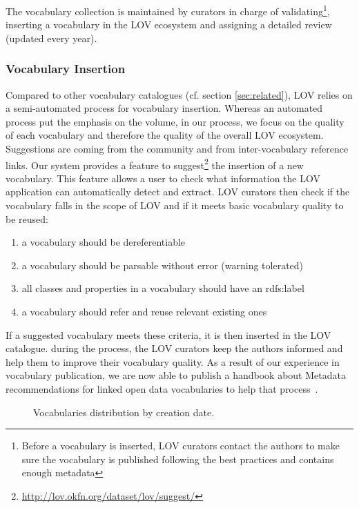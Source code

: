 \documentclass{iosart2c}
\begin{document}
The vocabulary collection is maintained by curators in charge of validating\footnote{Before a vocabulary is inserted, LOV curators contact the authors to make sure the vocabulary is published following the best practices and contains enough metadata}, inserting a vocabulary in the LOV ecosystem and assigning a detailed review (updated every year).

	\subsubsection{Vocabulary Insertion} Compared to other vocabulary catalogues (cf. section \ref{sec:related}), LOV relies on a semi-automated process for vocabulary insertion. Whereas an automated process put the emphasis on the volume, in our process, we focus on the quality of each vocabulary and therefore the quality of the overall LOV ecosystem. Suggestions are coming from the community and from inter-vocabulary reference links. Our system provides a feature to suggest\footnote{\url{http://lov.okfn.org/dataset/lov/suggest/}} the insertion of a new vocabulary. This feature allows a user to check what information the LOV application can automatically detect and extract. LOV curators then check if the vocabulary falls in the scope of LOV and if it meets basic vocabulary quality to be reused:
\begin{enumerate}
 \item a vocabulary should be dereferentiable
 \item a vocabulary should be parsable without error (warning tolerated)
 \item all classes and properties in a vocabulary should have an rdfs:label
 \item a vocabulary should refer and reuse relevant existing ones
\end{enumerate}
If a suggested vocabulary meets these criteria, it is then inserted in the LOV catalogue. during the process, the LOV curators keep the authors informed and help them to improve their vocabulary quality. As a result of our experience in vocabulary publication, we are now able to publish a handbook about Metadata recommendations for linked open data vocabularies to help that process~\cite{vandenbussche2011metadata}.

\begin{figure}[htb]

\caption{\label{fig:creaevol} Vocabularies distribution by creation date.}
\end{figure}
\end{document}
